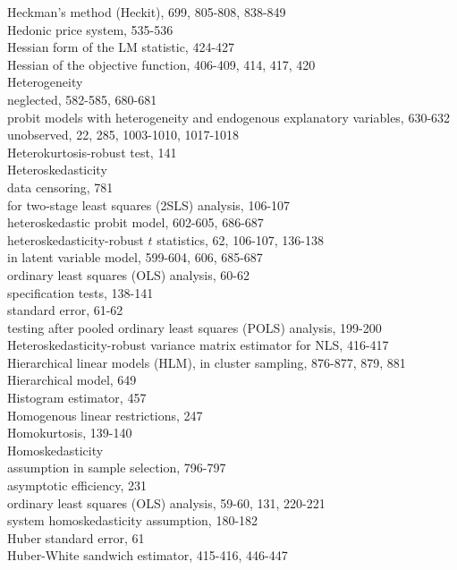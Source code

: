 \documentclass[10pt]{article}
\begin{document}
Heckman's method (Heckit), 699, 805-808, 838-849\\
Hedonic price system, 535-536\\
Hessian form of the LM statistic, 424-427\\
Hessian of the objective function, 406-409, 414, 417, 420\\
Heterogeneity\\
neglected, 582-585, 680-681\\
probit models with heterogeneity and endogenous explanatory variables, 630-632\\
unobserved, 22, 285, 1003-1010, 1017-1018\\
Heterokurtosis-robust test, 141\\
Heteroskedasticity\\
data censoring, 781\\
for two-stage least squares (2SLS) analysis, 106-107\\
heteroskedastic probit model, 602-605, 686-687\\
heteroskedasticity-robust $t$ statistics, 62, 106-107, 136-138\\
in latent variable model, 599-604, 606, 685-687\\
ordinary least squares (OLS) analysis, 60-62\\
specification tests, 138-141\\
standard error, 61-62\\
testing after pooled ordinary least squares (POLS) analysis, 199-200\\
Heteroskedasticity-robust variance matrix estimator for NLS, 416-417\\
Hierarchical linear models (HLM), in cluster sampling, 876-877, 879, 881\\
Hierarchical model, 649\\
Histogram estimator, 457\\
Homogenous linear restrictions, 247\\
Homokurtosis, 139-140\\
Homoskedasticity\\
assumption in sample selection, 796-797\\
asymptotic efficiency, 231\\
ordinary least squares (OLS) analysis, 59-60, 131, 220-221\\
system homoskedasticity assumption, 180-182\\
Huber standard error, 61\\
Huber-White sandwich estimator, 415-416, 446-447\\
\end{document}
